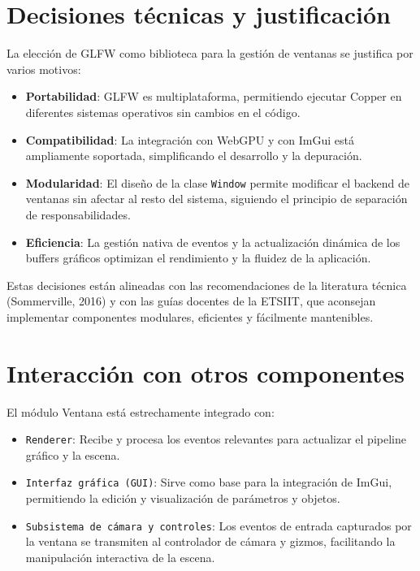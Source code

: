 \section{Decisiones técnicas y justificación}

La elección de GLFW como biblioteca para la gestión de ventanas se justifica
por varios motivos:

\begin{itemize}
    \item \textbf{Portabilidad}: GLFW es multiplataforma, permitiendo ejecutar Copper en diferentes sistemas operativos sin cambios en el código.
    \item \textbf{Compatibilidad}: La integración con WebGPU y con ImGui está ampliamente soportada, simplificando el desarrollo y la depuración.
    \item \textbf{Modularidad}: El diseño de la clase \texttt{Window} permite modificar el backend de ventanas sin afectar al resto del sistema, siguiendo el principio de separación de responsabilidades.
    \item \textbf{Eficiencia}: La gestión nativa de eventos y la actualización dinámica de los buffers gráficos optimizan el rendimiento y la fluidez de la aplicación.
\end{itemize}

Estas decisiones están alineadas con las recomendaciones de la literatura
técnica (Sommerville, 2016) y con las guías docentes de la ETSIIT, que
aconsejan implementar componentes modulares, eficientes y fácilmente
mantenibles.

\section{Interacción con otros componentes}

El módulo Ventana está estrechamente integrado con:

\begin{itemize}
    \item \texttt{Renderer}: Recibe y procesa los eventos relevantes para actualizar el pipeline gráfico y la escena.
    \item \texttt{Interfaz gráfica (GUI)}: Sirve como base para la integración de ImGui, permitiendo la edición y visualización de parámetros y objetos.
    \item \texttt{Subsistema de cámara y controles}: Los eventos de entrada capturados por la ventana se transmiten al controlador de cámara y gizmos, facilitando la manipulación interactiva de la escena.
\end{itemize}

